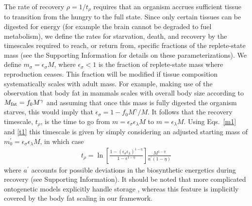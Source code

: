 \documentclass{pnastwo}
\begin{document}
\begin{article}
The rate of recovery $\rho = 1/t_\rho$ requires that an organism accrues
sufficient tissue to transition from the hungry to the full state.  Since
only certain tissues can be digested for energy (for example the brain cannot
be degraded to fuel metabolism), we define the rates for starvation, death,
and recovery by the timescales required to reach, or return from, specific
fractions of the replete-state mass (see the Supporting Information for details on these parameterizations).  We define
$m_{\sigma}=\epsilon_{\sigma} M$, where $\epsilon_{\sigma}<1$ is the fraction of
replete-state mass where reproduction ceases. This fraction will be modified
if tissue composition systematically scales with adult mass.  For example,
making use of the observation that body fat in mammals scales with overall
body size according to $M_{\rm fat}=f_{0}M^{\gamma}$ and assuming that once
this mass is fully digested the organism starves, this would imply that
$\epsilon_{\sigma}=1-f_{0}M^{\gamma}/M$. It follows that the
recovery timescale, $t_{\rho}$, is the time to go from
$m=\epsilon_{\sigma} \epsilon_{\lambda} M$ to $m=\epsilon_{\lambda}M$. Using Eqs.~\eqref{m1} and \eqref{t1} this timescale is given by simply considering an adjusted starting mass of $m_{0}^{\prime}=\epsilon_{\sigma}\epsilon_{\lambda}M$, in which case
\begin{eqnarray}
t_{\rho}=\ln\left[\frac{1-\left(\epsilon_{\sigma}\epsilon_{\lambda}\right)^{1-\eta}}{1-\epsilon^{1-\eta}}\right]\frac{M^{1-\eta}}{a^{\prime}\left(1-\eta\right)}
\end{eqnarray}
where $a^{\prime}$ accounts for possible deviations in the biosynthetic energetics during recovery (see Supporting Information). It should be noted that more complicated ontogenetic models explicitly handle
storage \cite{hou}, whereas this feature is implicitly covered by the body
fat scaling in our framework.


\end{article}
\end{document}
